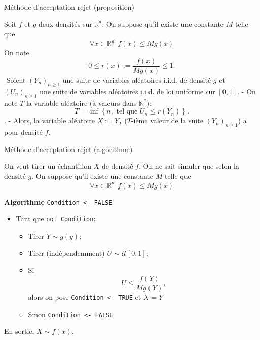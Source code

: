 \documentclass[ignorenonframetext,]{beamer}
\providecommand{\tightlist}{%
  \setlength{\itemsep}{0pt}\setlength{\parskip}{0pt}}
\newcommand{\R}{\mathbb{R}}
\begin{document}
\begin{frame}{Méthode d'acceptation rejet (proposition)}
\protect\hypertarget{muxe9thode-dacceptation-rejet-proposition}{}

Soit \(f\) et \(g\) deux densités sur \(\R^d\). On suppose qu'il existe
une constante \(M\) telle que \[\forall x \in \R^d~~f(x) \leq M g(x)\]
On note \[0 \leq r(x) := \frac{f(x)}{Mg(x)} \leq 1.\] \pause -Soient
\((Y_n)_{n\geq 1}\) une suite de variables aléatoires i.i.d. de densité
\(g\) et \((U_n)_{n\geq 1}\) une suite de variables aléatoires i.i.d. de
loi uniforme sur \([0, 1]\). \pause - On note \(T\) la variable
aléatoire (à valeurs dans \(\mathbb{N}^*\)):
\[T = \inf\left\lbrace n, \text{ tel que } U_n \leq r(Y_n)\right\rbrace.\].
\pause - Alors, la variable aléatoire \(X := Y_T\) (\(T\)-ième valeur de
la suite \((Y_n)_{n\geq 1}\)) a pour densité \(f\).

\end{frame}

\begin{frame}[fragile]{Méthode d'acceptation rejet (algorithme)}
\protect\hypertarget{muxe9thode-dacceptation-rejet-algorithme}{}

On veut tirer un échantillon \(X\) de densité \(f\). On ne sait simuler
que selon la densité \(g\). On suppose qu'il existe une constante \(M\)
telle que \[\forall x \in \R^d~~f(x) \leq M g(x)\]

\textbf{Algorithme} \texttt{Condition\ \textless{}-\ FALSE}

\begin{itemize}
\tightlist
\item
  Tant que \texttt{not\ Condition}:

  \begin{itemize}
  \tightlist
  \item
    Tirer \(Y \sim g(y)\);
  \item
    Tirer (indépendemment) \(U\sim \mathcal{U}[0, 1]\);
  \item
    Si \[U \leq \frac{f(Y)}{Mg(Y)},\] alors on pose
    \texttt{Condition\ \textless{}-\ TRUE} et \(X = Y\)
  \item
    Sinon \texttt{Condition\ \textless{}-\ FALSE}
  \end{itemize}
\end{itemize}

En sortie, \(X\sim f(x)\).

\end{frame}
\end{document}
